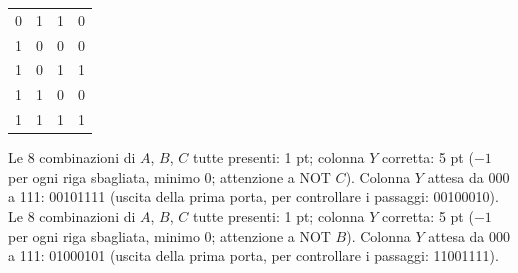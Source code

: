 \begin{esercizio}[6]
\begin{solution}
{{\begin{tabular}{ccc|c}
    0 & 1 & 1 & 0\\
    1 & 0 & 0 & 0\\
    1 & 0 & 1 & 1\\
    1 & 1 & 0 & 0\\
    1 & 1 & 1 & 1\\
  \end{tabular}}}
  \criterioRR
  {Le 8 combinazioni di $A$, $B$, $C$ tutte presenti: 1 pt; colonna $Y$ corretta: 5 pt ($-1$ per ogni riga sbagliata, minimo 0; attenzione a NOT $C$). Colonna $Y$ attesa da 000 a 111: 00101111 (uscita della prima porta, per controllare i passaggi: 00100010).}
  {Le 8 combinazioni di $A$, $B$, $C$ tutte presenti: 1 pt; colonna $Y$ corretta: 5 pt ($-1$ per ogni riga sbagliata, minimo 0; attenzione a NOT $B$). Colonna $Y$ attesa da 000 a 111: 01000101 (uscita della prima porta, per controllare i passaggi: 11001111).}
\end{solution}
\end{esercizio}
